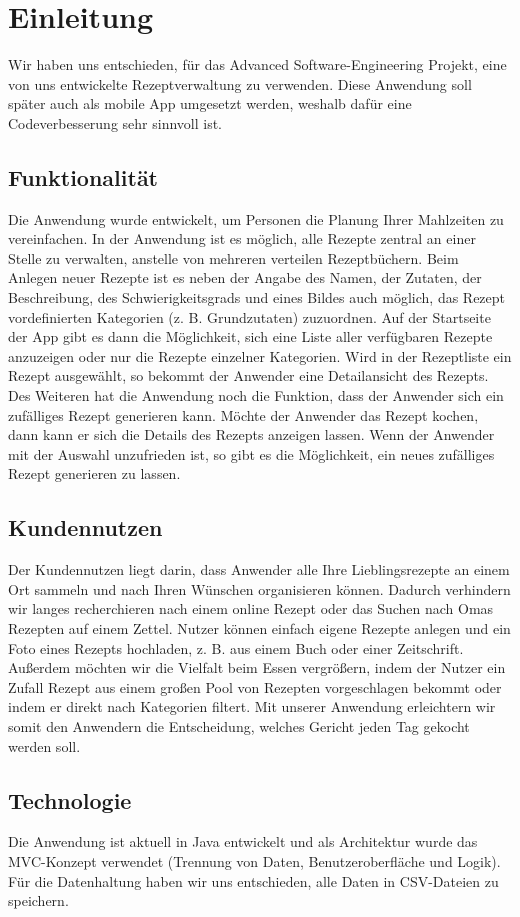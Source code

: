 \chapter{Einleitung}
Wir haben uns entschieden, für das Advanced Software-Engineering Projekt,
eine von uns entwickelte Rezeptverwaltung zu verwenden. Diese Anwendung
soll später auch als mobile App umgesetzt werden, weshalb dafür eine
Codeverbesserung sehr sinnvoll ist.
\section{Funktionalität}
Die Anwendung wurde entwickelt, um Personen die Planung Ihrer Mahlzeiten zu vereinfachen.
In der Anwendung ist es möglich, alle Rezepte zentral an einer Stelle zu verwalten, anstelle von
mehreren verteilen Rezeptbüchern. Beim Anlegen neuer Rezepte ist es neben der Angabe des
Namen, der Zutaten, der Beschreibung, des Schwierigkeitsgrads und eines Bildes auch möglich, das
Rezept vordefinierten Kategorien (z. B. Grundzutaten) zuzuordnen.
Auf der Startseite der App gibt es dann die Möglichkeit, sich eine Liste aller verfügbaren Rezepte
anzuzeigen oder nur die Rezepte einzelner Kategorien. Wird in der Rezeptliste ein Rezept
ausgewählt, so bekommt der Anwender eine Detailansicht des Rezepts.
Des Weiteren hat die Anwendung noch die Funktion, dass der Anwender sich ein zufälliges Rezept
generieren kann. Möchte der Anwender das Rezept kochen, dann kann er sich die Details des
Rezepts anzeigen lassen. Wenn der Anwender mit der Auswahl unzufrieden ist, so gibt es die
Möglichkeit, ein neues zufälliges Rezept generieren zu lassen.
\section{Kundennutzen}
Der Kundennutzen liegt darin, dass Anwender alle Ihre Lieblingsrezepte an einem Ort sammeln und
nach Ihren Wünschen organisieren können. Dadurch verhindern wir langes recherchieren nach
einem online Rezept oder das Suchen nach Omas Rezepten auf einem Zettel.
Nutzer können einfach eigene Rezepte anlegen und ein Foto eines Rezepts hochladen, z. B. aus
einem Buch oder einer Zeitschrift.
Außerdem möchten wir die Vielfalt beim Essen vergrößern, indem der Nutzer ein Zufall Rezept aus
einem großen Pool von Rezepten vorgeschlagen bekommt oder indem er direkt nach Kategorien
filtert.
Mit unserer Anwendung erleichtern wir somit den Anwendern die Entscheidung, welches Gericht
jeden Tag gekocht werden soll.
\section{Technologie}
Die Anwendung ist aktuell in Java entwickelt und als Architektur wurde das MVC-Konzept verwendet
(Trennung von Daten, Benutzeroberfläche und Logik).
Für die Datenhaltung haben wir uns entschieden, alle Daten in CSV-Dateien zu speichern. 